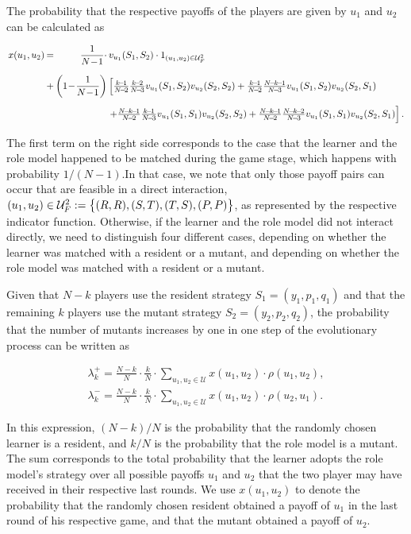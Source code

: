 \documentclass[11pt]{article}
\newcommand{\splitatcommas}[1]{%
  \begingroup
  \begingroup\lccode`~=`, \lowercase{\endgroup
    \edef~{\mathchar\the\mathcode`, \penalty0 \noexpand\hspace{0pt plus 1em}}%
  }\mathcode`,="8000 #1%
  \endgroup
}
\theoremstyle{plainCl1}
\theoremstyle{plainCl2}
\begin{document}
The probability that the respective payoffs of the players
are given by $u_1$ and $u_2$ can be calculated as

\begin{equation}\label{eq:Chi}
\setlength{\arraycolsep}{1pt}
\begin{array}{llrl}
x(u_1,u_2)	 &=&\displaystyle \frac{1}{N\!-\!1}\cdot  &v_{u_1}(S_1,S_2)\cdot 1_{(u_1,u_2)\in \mathcal{U}^2_F}\\[0.5cm]
&+	
&\displaystyle \left(1\!-\!\frac{1}{N\!-\!1}\right)  
&\left[ \frac{k\!-\!1}{N\!-\!2}\frac{k\!-\!2}{N\!-\!3} v_{u_1}(S_1,S_2) v_{u_2}(S_2,S_2) + 
 \frac{k\!-\!1}{N\!-\!2}\frac{N\!-\!k\!-\!1}{N\!-\!3} v_{u_1}(S_1,S_2) v_{u_2}(S_2,S_1)\right.\\[0.5cm]
&&&\left. +\frac{N\!-\!k\!-\!1}{N\!-\!2}\frac{k\!-\!1}{N\!-\!3} v_{u_1}(S_1,S_1) v_{u_2}(S_2,S_2) + 
 \frac{N\!-\!k\!-\!1}{N\!-\!2}\frac{N\!-\!k\!-\!2}{N\!-\!3} v_{u_1}(S_1,S_1) v_{u_2}(S_2,S_1)\right].
\end{array}
\end{equation}

The first term on the right side corresponds to the case that the learner and
the role model happened to be matched during the game stage, which happens with
probability $1/(N\!-\!1)$.In that case, we note that only those payoff pairs
can occur that are feasible in a direct interaction, $\splitatcommas{(u_1,u_2)\in
\mathcal{U}^2_F:=\big\{ (R,R), (S,T), (T,S), (P,P) \big\}}$, as represented by
the respective indicator function. Otherwise, if the learner and the role model
did not interact directly, we need to distinguish four different cases,
depending on whether the learner was matched with a resident or a mutant, and
depending on whether the role model was matched with a resident or a mutant.

Given that $N\!-\!k$ players use the resident strategy $S_1\!=\!(y_1,p_1,q_1)$
and that the remaining $k$ players use the mutant strategy
$S_2\!=\!(y_2,p_2,q_2)$, the probability that the number of mutants increases by
one in one step of the evolutionary process can be written as

\begin{align}
\lambda^+_k=\frac{N\!-\!k}{N}\cdot \frac{k}{N}\cdot \sum_{u_1,u_2\in\mathcal{U}} x(u_1,u_2)\cdot \rho(u_1,u_2), \\
\lambda^-_k=\frac{N\!-\!k}{N}\cdot \frac{k}{N}\cdot \sum_{u_1,u_2\in\mathcal{U}} x(u_1,u_2)\cdot \rho(u_2,u_1).
\end{align}

In this expression, $(N\!-\!k)/N$ is the probability that the randomly chosen
learner is a resident, and $k/N$ is the probability that the role model is a
mutant. The sum corresponds to the total probability that the learner adopts the
role model's strategy over all possible payoffs $u_1$ and $u_2$ that the two
player may have received in their respective last rounds. We use $x(u_1,u_2)$ to
denote the probability that the randomly chosen resident obtained a payoff of
$u_1$ in the last round of his respective game, and that the mutant obtained a
payoff of $u_2$.
\end{document}
